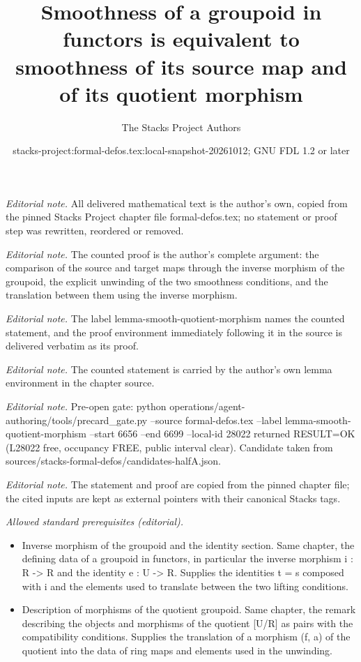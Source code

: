 \documentclass[10pt,a4paper]{amsart}
\title{Smoothness of a groupoid in functors is equivalent to smoothness of its source map and of its quotient morphism}
\author{The Stacks Project Authors}
\date{stacks-project:formal-defos.tex:local-snapshot-20261012; GNU FDL 1.2 or later}
\theoremstyle{plain}
\theoremstyle{definition}
\theoremstyle{remark}
\numberwithin{equation}{subsection}
\begin{document}
\maketitle
\noindent\textit{Editorial note.} All delivered mathematical text is the author's own, copied from the pinned Stacks Project chapter file formal-defos.tex; no statement or proof step was rewritten, reordered or removed.\par\medskip
\noindent\textit{Editorial note.} The counted proof is the author's complete argument: the comparison of the source and target maps through the inverse morphism of the groupoid, the explicit unwinding of the two smoothness conditions, and the translation between them using the inverse morphism.\par\medskip
\noindent\textit{Editorial note.} The label lemma-smooth-quotient-morphism names the counted statement, and the proof environment immediately following it in the source is delivered verbatim as its proof.\par\medskip
\noindent\textit{Editorial note.} The counted statement is carried by the author's own lemma environment in the chapter source.\par\medskip
\noindent\textit{Editorial note.} Pre-open gate: python operations/agent-authoring/tools/precard\_gate.py --source formal-defos.tex --label lemma-smooth-quotient-morphism --start 6656 --end 6699 --local-id 28022 returned RESULT=OK (L28022 free, occupancy FREE, public interval clear). Candidate taken from sources/stacks-formal-defos/candidates-halfA.json.\par\medskip
\noindent\textit{Editorial note.} The statement and proof are copied from the pinned chapter file; the cited inputs are kept as external pointers with their canonical Stacks tags.\par\medskip
\noindent\textit{Allowed standard prerequisites (editorial).}\begin{itemize}
\item Inverse morphism of the groupoid and the identity section. Same chapter, the defining data of a groupoid in functors, in particular the inverse morphism i : R -> R and the identity e : U -> R. Supplies the identities t = s composed with i and the elements used to translate between the two lifting conditions.
\item Description of morphisms of the quotient groupoid. Same chapter, the remark describing the objects and morphisms of the quotient [U/R] as pairs with the compatibility conditions. Supplies the translation of a morphism (f, a) of the quotient into the data of ring maps and elements used in the unwinding.
\end{itemize}\medskip
\end{document}
